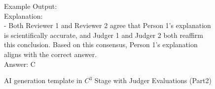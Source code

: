 \begin{figure*}[h]
\begin{tcolorbox}[colframe=cyan!40!black, title=\textbf{Prompt for $C^3$ Generation (Part 2)}]
Example Output: \\
Explanation: \\
- Both Reviewer 1 and Reviewer 2 agree that Person 1's explanation is scientifically accurate, and Judger 1 and Judger 2 both reaffirm this conclusion. Based on this consensus, Person 1’s explanation aligns with the correct answer. \\
Answer: C


\end{tcolorbox}
\caption{AI generation template in $C^3$ Stage with Judger Evaluations (Part2)}
\label{prompt:c3_part2}
\end{figure*}